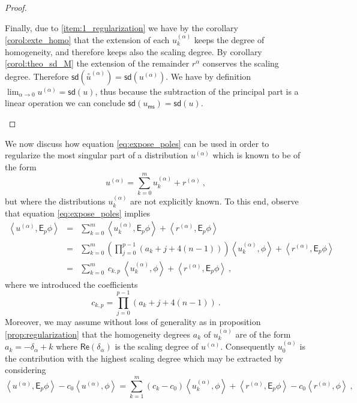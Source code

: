 \documentclass[11pt]{book}
\newcommand{\ms}{\mathsf{ms}}
\newcommand{\sd}{\mathsf{sd}}
\renewcommand{\Re}{\mathsf{Re}}
\newcommand{\sm}[1]{\left\langle#1\right\rangle}
\newcommand{\exte}[1]{\overset{\circ}{#1}}
\newcommand{\Esf}{\mathsf{E}}
\theoremstyle{break}
\begin{document}
\begin{proof}
\begin{description}
%
Finally, due to \ref{item:1_regularization} we have by the corollary \ref{corol:exte_homo} that the extension of each $u^{(\alpha)}_k$ keeps the degree of homogeneity, and therefore keeps also the scaling degree. By corollary \ref{corol:theo_sd_M} the extension of the remainder $r^\alpha$ conserves the scaling degree. Therefore $\sd(\exte{u}^{(\alpha)})=\sd(u^{(\alpha)})$. We have by definition $\lim_{\alpha\to 0}u^{(\alpha)} = \sd(u)$, thus because the subtraction of the principal part is a linear operation we can conclude $\sd(u_\ms)=\sd(u)$.
%
%
\end{description}
\end{proof}



We now discuss how equation \eqref{eq:expose_poles} can be used in order to regularize the most singular part of a distribution $u^{(\alpha)}$ which is known to be of the form
%
\begin{equation*}
u^{(\alpha)} = \sum_{k=0}^m u^{(\alpha)}_k + r^{(\alpha)} \ ,
\end{equation*}
%
but where the distributions $u^{(\alpha)}_k$ are not explicitly known. To this end, observe that equation \eqref{eq:expose_poles} implies
%
\begin{eqnarray*}
\sm{ u^{(\alpha)} , \Esf_p \phi } &=& \sum_{k=0}^m \sm{u^{(\alpha)}_k , \Esf_p \phi } + \sm{r^{(\alpha)} , \Esf_p \phi } \\
&=& \sum_{k=0}^m \left( \prod_{j=0}^{p-1} (a_k+j+4(n-1)) \right) \sm{ u^{(\alpha)}_k , \phi } + \sm{ r^{(\alpha)} , \Esf_p \phi } \\
&=& \sum_{k=0}^m \ c_{k,p} \ \sm{ u^{(\alpha)}_k , \phi } + \sm{ r^{(\alpha)} , \Esf_p \phi } \ ,
\end{eqnarray*}
%
where we introduced the coefficients
%
\begin{equation*}
c_{k,p} = \prod_{j=0}^{p-1} \left(a_k+j+4(n-1)\right) \ .
\end{equation*}
%
Moreover, we may assume without loss of generality as in proposition \ref{prop:regularization} that the homogeneity degrees $a_k$ of $u^{(\alpha)}_k$ are of the form $a_k = -\delta_\alpha + k$ where $\Re(\delta_\alpha)$ is the scaling degree of $u^{(\alpha)}$. Consequently $u^{(\alpha)}_0$ is the contribution with the highest scaling degree which may be extracted by considering
%
\begin{equation}
\sm{ u^{(\alpha)} , \Esf_p \phi } - c_0 \sm{ u^{(\alpha)} , \phi } = \sum_{k=1}^m (c_k-c_0) \sm{ u^{(\alpha)}_k , \phi } + \sm{ r^{(\alpha)} , \Esf_p \phi } - c_0 \sm{ r^{(\alpha)}, \phi } \ ,
\label{eq:decrease_scaling_degree}
\end{equation}
\end{document}
